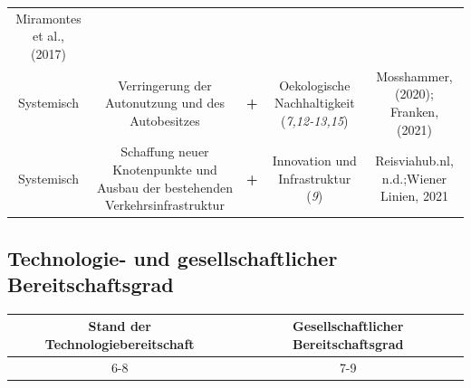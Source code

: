 \documentclass[
]{book}
\begin{document}
\begin{longtable}[]{@{}ccccc@{}}
\begin{minipage}[t]{0.17\columnwidth}
Miramontes et al., (2017)\strut
\end{minipage}\tabularnewline
\begin{minipage}[t]{0.17\columnwidth}\centering
Systemisch\strut
\end{minipage} & \begin{minipage}[t]{0.16\columnwidth}\centering
Verringerung der Autonutzung und des Autobesitzes\strut
\end{minipage} & \begin{minipage}[t]{0.17\columnwidth}\centering
\textbf{+}\strut
\end{minipage} & \begin{minipage}[t]{0.17\columnwidth}\centering
Oekologische Nachhaltigkeit (\emph{7,12-13,15})\strut
\end{minipage} & \begin{minipage}[t]{0.17\columnwidth}\centering
Mosshammer, (2020); Franken, (2021)\strut
\end{minipage}\tabularnewline
\begin{minipage}[t]{0.17\columnwidth}\centering
Systemisch\strut
\end{minipage} & \begin{minipage}[t]{0.16\columnwidth}\centering
Schaffung neuer Knotenpunkte und Ausbau der bestehenden Verkehrsinfrastruktur\strut
\end{minipage} & \begin{minipage}[t]{0.17\columnwidth}\centering
\textbf{+}\strut
\end{minipage} & \begin{minipage}[t]{0.17\columnwidth}\centering
Innovation und Infrastruktur (\emph{9})\strut
\end{minipage} & \begin{minipage}[t]{0.17\columnwidth}\centering
Reisviahub.nl, n.d.;Wiener Linien, 2021\strut
\end{minipage}\tabularnewline
\bottomrule
\end{longtable}

\hypertarget{technologie--und-gesellschaftlicher-bereitschaftsgrad-25}{%
\subsection*{Technologie- und gesellschaftlicher Bereitschaftsgrad}\label{technologie--und-gesellschaftlicher-bereitschaftsgrad-25}}

\begin{longtable}[]{@{}cc@{}}
\toprule
Stand der Technologiebereitschaft & Gesellschaftlicher Bereitschaftsgrad\tabularnewline
\midrule
\endhead
6-8 & 7-9\tabularnewline
\bottomrule
\end{longtable}
\end{document}
